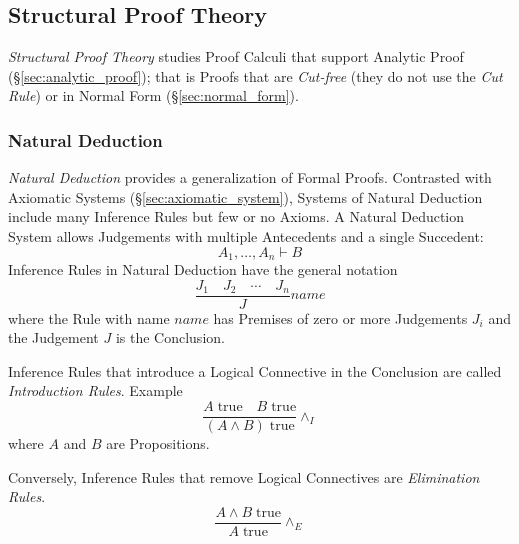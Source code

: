 \subsection{Structural Proof Theory}\label{sec:structural_proof}

\emph{Structural Proof Theory} studies Proof Calculi that support
Analytic Proof (\S\ref{sec:analytic_proof}); that is Proofs that are
\emph{Cut-free} (they do not use the \emph{Cut Rule}) or in Normal
Form (\S\ref{sec:normal_form}).



\subsubsection{Natural Deduction}\label{sec:natural_deduction}
\cite{prawitz65}

\emph{Natural Deduction} provides a generalization of Formal Proofs.
Contrasted with Axiomatic Systems (\S\ref{sec:axiomatic_system}),
Systems of Natural Deduction include many Inference Rules but few or
no Axioms. A Natural Deduction System allows Judgements with multiple
Antecedents and a single Succedent:
\[
    A_1,\ldots,A_n \vdash B
\]
Inference Rules in Natural Deduction have the general notation
\[
    {
        \frac{J_1 \quad J_2 \quad \cdots \quad J_n}
        {J}
    } name
\]
where the Rule with name $name$ has Premises of zero or more
Judgements $J_i$ and the Judgement $J$ is the Conclusion.

Inference Rules that introduce a Logical Connective in the Conclusion
are called \emph{Introduction Rules}. Example
\[
    {
        \frac{A\;\mathrm{true} \quad B\;\mathrm{true}}
        {(A \wedge B)\;\mathrm{true}}
    } \wedge_I
\]
where $A$ and $B$ are Propositions.

Conversely, Inference Rules that remove Logical Connectives are
\emph{Elimination Rules}.
\[
    {
        \frac{A \wedge B\;\mathrm{true}}
        {A\;\mathrm{true}}
    } \wedge_E
\]

